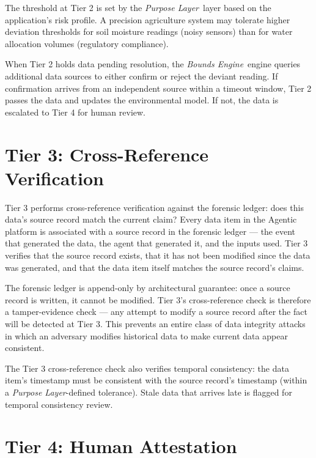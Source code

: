 \documentclass[12pt]{article}
\newcommand{\purpose}{\textit{Purpose Layer}}
\newcommand{\bounds}{\textit{Bounds Engine}}
\begin{document}
The threshold at Tier 2 is set by the \purpose\ layer based on the application's risk profile. A precision agriculture system may tolerate higher deviation thresholds for soil moisture readings (noisy sensors) than for water allocation volumes (regulatory compliance).

When Tier 2 holds data pending resolution, the \bounds\ engine queries additional data sources to either confirm or reject the deviant reading. If confirmation arrives from an independent source within a timeout window, Tier 2 passes the data and updates the environmental model. If not, the data is escalated to Tier 4 for human review.

\section{Tier 3: Cross-Reference Verification}
\label{sec:tier3}

Tier 3 performs cross-reference verification against the forensic ledger: does this data's source record match the current claim? Every data item in the Agentic platform is associated with a source record in the forensic ledger — the event that generated the data, the agent that generated it, and the inputs used. Tier 3 verifies that the source record exists, that it has not been modified since the data was generated, and that the data item itself matches the source record's claims.

The forensic ledger is append-only by architectural guarantee: once a source record is written, it cannot be modified. Tier 3's cross-reference check is therefore a tamper-evidence check — any attempt to modify a source record after the fact will be detected at Tier 3. This prevents an entire class of data integrity attacks in which an adversary modifies historical data to make current data appear consistent.

The Tier 3 cross-reference check also verifies temporal consistency: the data item's timestamp must be consistent with the source record's timestamp (within a \purpose-defined tolerance). Stale data that arrives late is flagged for temporal consistency review.

\section{Tier 4: Human Attestation}
\label{sec:tier4}
\end{document}
